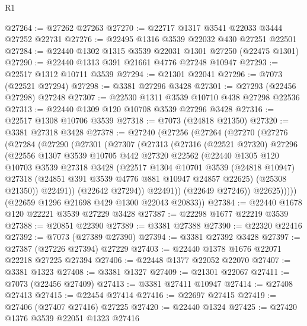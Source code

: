 \begin{lexlean}{R1}
\begin{coremodule}
@27264 := @27262 @27263
@27270 := @22717 @1317 @3541 @22033 @3444 @27252 @22731
@27276 := @22495 @1316 @3539 @22032 @430 @27251 @22501
@27284 := @22440 @1302 @1315 @3539 @22031 @1301 @27250 (@22475 @1301)
@27290 := @22440 @1313 @391 @21661 @4776 @27248 @10947
@27293 := @22517 @1312 @10711 @3539
@27294 := @21301 @22041
@27296 := @7073 (@22521 @27294)
@27298 := @3381 @27296 @3428
@27301 := @27293 (@22456 @27298) @27248
@27307 := @22530 @1311 @3539 @10710 @438 @27298 @22536
@27313 := @22440 @1309 @120 @10708 @3539 @27296 @3428
@27316 := @22517 @1308 @10706 @3539
@27318 := @7073 (@24818 @21350)
@27320 := @3381 @27318 @3428
@27378 := @27240
    (@27256
      (@27264
        (@27270
          (@27276
            (@27284
              (@27290
                (@27301
                  (@27307
                    (@27313
                      (@27316
                        (@22521 @27320)
                        @27296
                        (@22556
                          @1307
                          @3539
                          @10705
                          @442
                          @27320
                          @22562
                          (@22440
                            @1305
                            @120
                            @10703
                            @3539
                            @27318
                            @3428
                            (@22517
                              @1304
                              @10701
                              @3539
                              (@24818 @10947)
                              @27318
                              (@24851 @391 @3539 @4776 @881 @10947 @24857 @22625)
                              (@25308 @21350))
                            @22491))
                        (@22642 @27294))
                      @22491))
                  (@22649 @27246))
                @22625)))))
      (@22659 @1296 @21698 @429 @1300 @22043 @20833))
@27384 := @22440 @1678 @120 @22221 @3539 @27229 @3428
@27387 := @22298 @1677 @22219 @3539
@27388 := @20851 @22390
@27389 := @3381 @27388
@27390 := @22320 @22416
@27392 := @7073 (@27389 @27390)
@27394 := @3381 @27392 @3428
@27397 := @27387 (@27226 @27394) @27229
@27403 := @22440 @1378 @1676 @22071 @22218 @27225 @27394
@27406 := @22448 @1377 @22052 @22070
@27407 := @3381 @1323
@27408 := @3381 @1327
@27409 := @21301 @22067
@27411 := @7073 (@22456 @27409)
@27413 := @3381 @27411 @10947
@27414 := @27408 @27413
@27415 := @22454 @27414
@27416 := @22697 @27415
@27419 := @27406 (@27407 @27416) @27225
@27420 := @22440 @1324
@27425 := @27420 @1376 @3539 @22051 @1323 @27416

\end{coremodule}
\end{lexlean}
